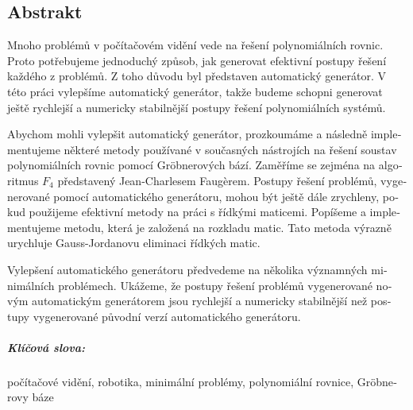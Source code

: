 \begin{otherlanguage}{czech}
\chapter*{Abstrakt}
Mnoho problémů v počítačovém vidění vede na řešení polynomiálních rovnic. Proto potřebujeme jednoduchý způsob, jak generovat efektivní postupy řešení každého z problémů. Z toho důvodu byl představen automatický generátor. V této práci vylepšíme automatický generátor, takže budeme schopni generovat ještě rychlejší a numericky stabilnější postupy řešení polynomiálních systémů.

Abychom mohli vylepšit automatický generátor, prozkoumáme a následně implementujeme některé metody používané v současných nástrojích na řešení soustav polynomiálních rovnic pomocí Gr\"obnerových bází. Zaměříme se zejména na algoritmus $F_4$ představený Jean-Charlesem Faug\`erem. Postupy řešení problémů, vygenerované pomocí automatického generátoru, mohou být ještě dále zrychleny, pokud použijeme efektivní metody na práci s řídkými maticemi. Popíšeme a implementujeme metodu, která je založená na rozkladu matic. Tato metoda výrazně urychluje Gauss-Jordanovu eliminaci řídkých matic.

Vylepšení automatického generátoru předvedeme na několika významných mini\-mál\-ních problémech. Ukážeme, že postupy řešení problémů vygenerované novým automatickým generátorem jsou rychlejší a numericky stabilnější než postupy vygenerované původní verzí automatického generátoru.

\paragraph{Klíčová slova:} počítačové vidění, robotika, minimální problémy, polynomiální rovnice, Gr\"obnerovy báze
\end{otherlanguage}
